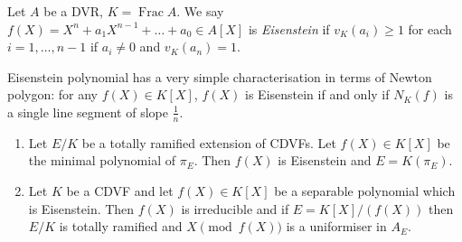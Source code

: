 \documentclass[a4paper]{article}
\DeclareMathOperator{\Frac}{Frac}
\begin{document}
\begin{definition}
  Let \(A\) be a DVR, \(K = \Frac A\). We say \(f(X) = X^n + a_1 X^{n - 1} + \dots + a_0 \in A[X]\) is \emph{Eisenstein} if \(v_K(a_i) \geq 1\)  for each \(i = 1, \dots, n - 1\) if \(a_i \neq 0\) and \(v_K(a_n) = 1\).
\end{definition}

Eisenstein polynomial has a very simple characterisation in terms of Newton polygon: for any \(f(X) \in K[X]\), \(f(X)\) is Eisenstein if and only if \(N_K(f)\) is a single line segment of slope \(\frac{1}{n}\).

\begin{proposition}\leavevmode
  \begin{enumerate}
  \item Let \(E/K\) be a totally ramified extension of CDVFs. Let \(f(X) \in K[X]\) be the minimal polynomial of \(\pi_E\). Then \(f(X)\) is Eisenstein and \(E = K(\pi_E)\).
  \item Let \(K\) be a CDVF and let \(f(X) \in K[X]\) be a separable polynomial which is Eisenstein. Then \(f(X)\) is irreducible and if \(E = K[X]/(f(X))\) then \(E/K\) is totally ramified and \(X \pmod{f(X)}\) is a uniformiser in \(A_E\).
  \end{enumerate}
\end{proposition}
\end{document}

